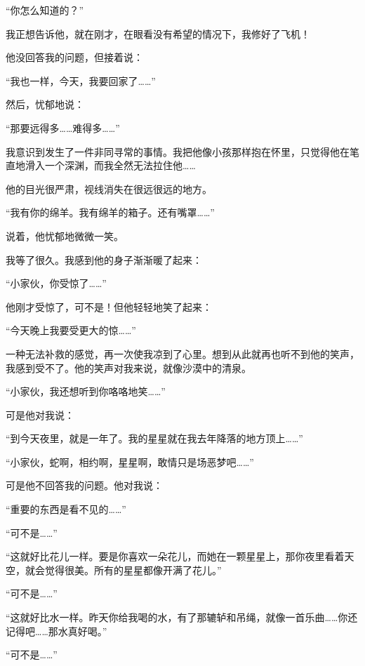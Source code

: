 “你怎么知道的？”

我正想告诉他，就在刚才，在眼看没有希望的情况下，我修好了飞机！

他没回答我的问题，但接着说：

“我也一样，今天，我要回家了\ldots{}\ldots{}”

然后，忧郁地说：

“那要远得多\ldots{}\ldots{}难得多\ldots{}\ldots{}”

我意识到发生了一件非同寻常的事情。我把他像小孩那样抱在怀里，只觉得他在笔直地滑入一个深渊，而我全然无法拉住他\ldots{}\ldots{}

他的目光很严肃，视线消失在很远很远的地方。

“我有你的绵羊。我有绵羊的箱子。还有嘴罩\ldots{}\ldots{}”

说着，他忧郁地微微一笑。

{\startalignment[center]
 \stopalignment}

我等了很久。我感到他的身子渐渐暖了起来：

“小家伙，你受惊了\ldots{}\ldots{}”

他刚才受惊了，可不是！但他轻轻地笑了起来：

“今天晚上我要受更大的惊\ldots{}\ldots{}”

一种无法补救的感觉，再一次使我凉到了心里。想到从此就再也听不到他的笑声，我感到受不了。他的笑声对我来说，就像沙漠中的清泉。

“小家伙，我还想听到你咯咯地笑\ldots{}\ldots{}”

可是他对我说：

“到今天夜里，就是一年了。我的星星就在我去年降落的地方顶上\ldots{}\ldots{}”

“小家伙，蛇啊，相约啊，星星啊，敢情只是场恶梦吧\ldots{}\ldots{}”

可是他不回答我的问题。他对我说：

“重要的东西是看不见的\ldots{}\ldots{}”

“可不是\ldots{}\ldots{}”

“这就好比花儿一样。要是你喜欢一朵花儿，而她在一颗星星上，那你夜里看着天空，就会觉得很美。所有的星星都像开满了花儿。”

“可不是\ldots{}\ldots{}”

“这就好比水一样。昨天你给我喝的水，有了那辘轳和吊绳，就像一首乐曲\ldots{}\ldots{}你还记得吧\ldots{}\ldots{}那水真好喝。”

“可不是\ldots{}\ldots{}”

